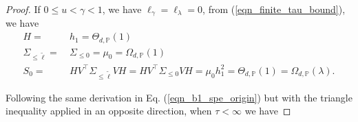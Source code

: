 \documentclass{article}
\theoremstyle{plain}
\theoremstyle{definition}
\theoremstyle{remark}
\begin{document}
\begin{appendix}
\begin{proof}
\vspace{10pt}


If $0 \leq u < \gamma <1$, we have 
$\ell_{\gamma}=\ell_{\lambda}=0$, from (\ref{eqn_finite_tau_bound}), we have
\begin{equation}\label{eqn_lower_bound_H_S0}
    \begin{aligned}
    H =&~ h_1 = \Theta_{d, \mathbb{P}}(1)\\
    \Sigma_{\leq \tilde{\ell}} =&~ \Sigma_{\leq 0} = \mu_0 = \Omega_{d, \mathbb{P}}( 1 )\\
    S_0 =&~ HV^{\top}\Sigma_{\leq \tilde{\ell}} VH = HV^{\top}\Sigma_{\leq 0} VH = \mu_0 h_1^2 = \Theta_{d, \mathbb{P}}( 1 ) = \Omega_{d, \mathbb{P}}(\lambda).
\end{aligned}
\end{equation}



Following the same derivation in Eq. (\ref{eqn_b1_spe_origin}) but with the triangle inequality applied in an opposite direction, when $\tau < \infty$ we have  


\end{proof}
\end{appendix}
\end{document}
